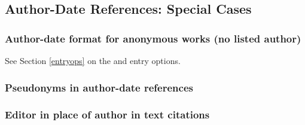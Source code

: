 \documentclass[11pt,letterpaper,oneside]{article}
\begin{document}
\begin{citeref}
\item \parencite{schonen2017a}
\item \parencite{schonen2017b}
\end{citeref}

\setcounter{subsection}{2}
\subsection{Author-Date References: Special Cases}
\setcounter{subsection}{15}

\setcounter{subsubsection}{33}
\subsubsection{Author-date format for anonymous works (no listed author)}

See Section \ref{entryops} on the  and 
entry options.

\begin{citeref}
\item \parencite{anon1610}
\item \parencite{anon1547}
\item \parencite{horsley1796}
\item \parencite{hawkes1834}
\end{citeref}

\subsubsection{Pseudonyms in author-date references}

\begin{citeref}
\item \parencite{stendhal1925}
\end{citeref}

\subsubsection{Editor in place of author in text citations}

\begin{citeref}
\item \parencite{silverstein1974}
\item \parencite{soltes1999}
\end{citeref}
\end{document}
